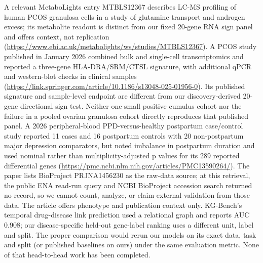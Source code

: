 \documentclass[11pt,a4paper]{article}
\begin{document}
A relevant MetaboLights entry MTBLS12367 describes LC-MS profiling of human PCOS granulosa cells in a study of glutamine transport and androgen excess; its metabolite readout is distinct from our fixed 20-gene RNA sign panel and offers context, not replication (\url{https://www.ebi.ac.uk/metabolights/ws/studies/MTBLS12367}). A PCOS study published in January 2026 combined bulk and single-cell transcriptomics and reported a three-gene HLA-DRA/SRM/CTSL signature, with additional qPCR and western-blot checks in clinical samples (\url{https://link.springer.com/article/10.1186/s13048-025-01956-0}). Its published signature and sample-level endpoint are different from our discovery-derived 20-gene directional sign test. Neither one small positive cumulus cohort nor the failure in a pooled ovarian granulosa cohort directly reproduces that published panel. A 2026 peripheral-blood PPD-versus-healthy postpartum case/control study reported 11 cases and 16 postpartum controls with 20 non-postpartum major depression comparators, but noted imbalance in postpartum duration and used nominal rather than multiplicity-adjusted p values for its 289 reported differential genes (\url{https://pmc.ncbi.nlm.nih.gov/articles/PMC13590264/}). The paper lists BioProject PRJNA1456230 as the raw-data source; at this retrieval, the public ENA read-run query and NCBI BioProject accession search returned no record, so we cannot count, analyze, or claim external validation from those data. The article offers phenotype and publication context only. KG-Bench's temporal drug-disease link prediction used a relational graph and reports AUC 0.908; our disease-specific held-out gene-label ranking uses a different unit, label and split. The proper comparison would rerun our models on its exact data, task and split (or published baselines on ours) under the same evaluation metric. None of that head-to-head work has been completed.
\end{document}
